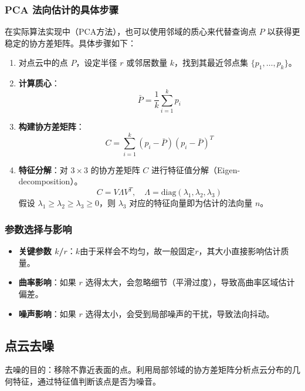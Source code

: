 \documentclass[12pt]{article}
\begin{document}
\subsubsection{PCA 法向估计的具体步骤}
在实际算法实现中（PCA方法），也可以使用邻域的质心来代替查询点 $P$ 以获得更稳定的协方差矩阵。具体步骤如下：

\begin{enumerate}
    \item 对点云中的点 $P$，设定半径 $r$ 或邻居数量 $k$，找到其最近邻点集 $\{p_1, \dots, p_k\}$。
    \item \textbf{计算质心}：
    \begin{equation}
        \bar{P} = \frac{1}{k} \sum_{i=1}^{k} p_i
    \end{equation}
    \item \textbf{构建协方差矩阵}：
    \begin{equation}
        C = \sum_{i=1}^{k} (p_i - \bar{P})(p_i - \bar{P})^T
    \end{equation}
    \item \textbf{特征分解}：对 $3 \times 3$ 的协方差矩阵 $C$ 进行特征值分解（Eigen-decomposition）。
    \begin{equation}
        C = V \Lambda V^T, \quad \Lambda = \text{diag}(\lambda_1, \lambda_2, \lambda_3)
    \end{equation}
    假设 $\lambda_1 \ge \lambda_2 \ge \lambda_3 \ge 0$，则 $\lambda_3$ 对应的特征向量即为估计的法向量 $n$。
\end{enumerate}

\subsubsection{参数选择与影响}
\begin{itemize}
    \item \textbf{关键参数 $k$/$r$}：$k$由于采样会不均匀，故一般固定$r$，其大小直接影响估计质量。
    \item \textbf{曲率影响}：如果 $r$ 选得太大，会忽略细节（平滑过度），导致高曲率区域估计偏差。
    \item \textbf{噪声影响}：如果 $r$ 选得太小，会受到局部噪声的干扰，导致法向抖动。
\end{itemize}

\subsection{点云去噪}

去噪的目的：移除不靠近表面的点。利用局部邻域的协方差矩阵分析点云分布的几何特征，通过特征值判断该点是否为噪音。
\end{document}
